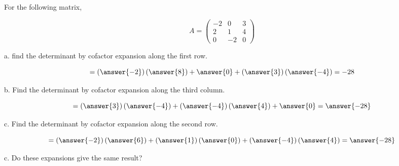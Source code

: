\documentclass{ximera}
\author{Parisa Fatheddin}
\begin{document}
\begin{exercise}

For the following matrix,

\[A = \begin{pmatrix}
-2 & 0 & 3\\
2 & 1 & 4 \\
0 & -2 & 0
\end{pmatrix}
\]

a. find the determinant by cofactor expansion along the first row.

\begin{prompt}
\[
= \left(\answer{-2}\right)\left(\answer{8}\right) + \answer{0} + \left(\answer{3}\right)\left(\answer{-4}\right) = -28
\]
\end{prompt}

b. Find the determinant by cofactor expansion along the third column.

\begin{prompt}
\[
= \left(\answer{3}\right)\left(\answer{-4}\right) + \left(\answer{-4}\right) \left(\answer{4}\right) + \answer{0} = \answer{-28}
\]
\end{prompt}

c. Find the determinant by cofactor expansion along the second row.

\begin{prompt}
\[
= \left(\answer{-2}\right)\left(\answer{6}\right) + \left(\answer{1}\right)\left(\answer{0}\right) + \left(\answer{-4}\right)\left(\answer{4}\right)= \answer{-28}
\]
\end{prompt}

c. Do these expansions give the same result?

\begin{prompt}
\begin{multipleChoice}
\end{multipleChoice}
\end{prompt}



















\end{exercise}
\end{document}

